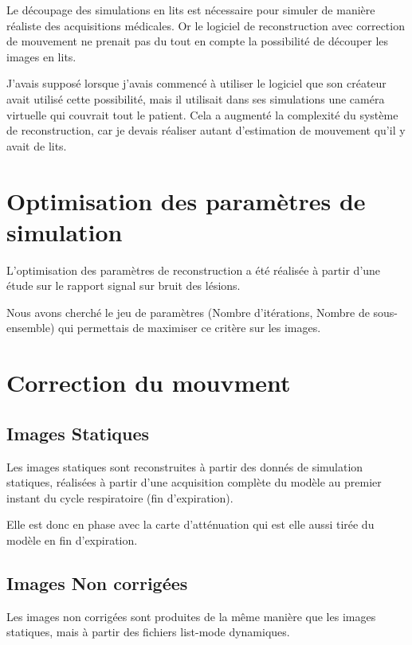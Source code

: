 Le découpage des simulations en lits est nécessaire pour simuler de manière réaliste des acquisitions médicales. Or le logiciel de reconstruction avec correction de mouvement ne prenait pas du tout en compte la possibilité de découper les images en lits. 

J'avais supposé lorsque j'avais commencé à utiliser le logiciel que son créateur avait utilisé cette possibilité, mais il utilisait dans ses simulations une caméra virtuelle qui couvrait tout le patient. Cela a augmenté la complexité du système de reconstruction, car je devais réaliser autant d'estimation de mouvement qu'il y avait de lits.


\section{Optimisation des paramètres de simulation}

L'optimisation des paramètres de reconstruction a été réalisée à partir d'une étude sur le rapport signal sur bruit des lésions.

Nous avons cherché le jeu de paramètres (Nombre d'itérations, Nombre de sous-ensemble) qui permettais de maximiser ce critère sur les images.

\section{Correction du mouvment}

\subsection{Images Statiques}

Les images statiques sont reconstruites à partir des donnés de simulation statiques, réalisées à partir d'une acquisition complète du modèle au premier instant du cycle respiratoire (fin d'expiration).

Elle est donc en phase avec la carte d'atténuation qui est elle aussi tirée du modèle en fin d'expiration.

\subsection{Images Non corrigées}

Les images non corrigées sont produites de la même manière que les images statiques, mais à partir des fichiers list-mode dynamiques.


